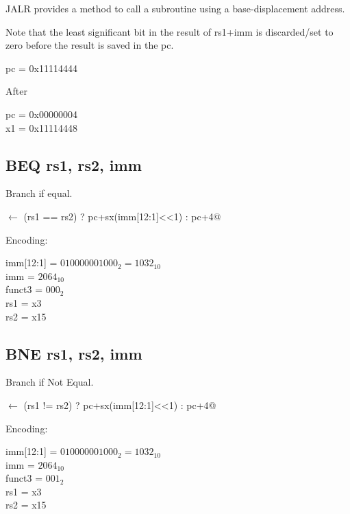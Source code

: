 JALR provides a method to call a subroutine using a base-displacement address.


Note that the least significant bit in the result of rs1+imm is 
discarded/set to zero before the result is saved in the pc.
 
pc = 0x11114444

After

pc = 0x00000004\\
x1 = 0x11114448



\subsection{BEQ rs1, rs2, imm}

Branch if equal.

\verb@pc@ $\leftarrow$ \verb@(rs1 == rs2) ? pc+sx(imm[12:1]<<1) : pc+4@

Encoding:


imm[12:1] = $010000001000_2 = 1032_{10}$\\
imm = $2064_{10}$\\
funct3 = $000_2$\\
rs1 = x3\\
rs2 = x15



\subsection{BNE rs1, rs2, imm}

Branch if Not Equal.

\verb@pc@ $\leftarrow$ \verb@(rs1 != rs2) ? pc+sx(imm[12:1]<<1) : pc+4@

Encoding:


imm[12:1] = $010000001000_2 = 1032_{10}$\\
imm = $2064_{10}$\\
funct3 = $001_2$\\
rs1 = x3\\
rs2 = x15


